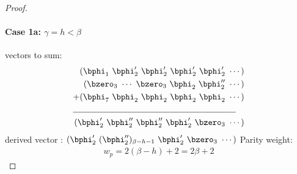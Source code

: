 \begin{proof}
 

\paragraph{Case 1a: $\gamma=h<\beta$ \newline}
 vectors to sum:
 \begin{align*}
(\bphi_1~\bphi'_2~\bphi'_2~\bphi'_2~\bphi'_2~\cdots)\\
(\bzero_{3}~\cdots~\bzero_{3}~\bphi_2~\bphi''_2~\cdots)\\
+(\bphi_7~\bphi_2~\bphi_2~\bphi_2~\bphi_2~\cdots)\\
\cline{1-2}
(\bphi'_2~\bphi''_2~\bphi''_2~\bphi'_2~\bzero_3~\cdots)
\end{align*}
derived vector : $(\bphi'_2~(\bphi''_2)_{\beta-h-1}~\bphi'_2~\bzero_3~\cdots)$
\newline
Parity weight: \begin{equation}
\begin{split}
w_p=2(\beta-h)+2 =2\beta+2
\end{split}
\end{equation}


\end{proof}
